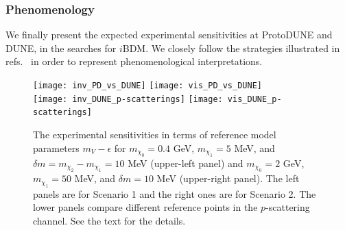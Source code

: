 

\subsubsection{Phenomenology}\label{Sec:Pheno}

We finally present the expected experimental sensitivities at ProtoDUNE and DUNE, in the searches for $i$BDM.
We closely follow the strategies illustrated in refs.~\cite{Giudice:2017zke, Chatterjee:2018mej, Kim:2018veo} in order to represent phenomenological interpretations. 

\begin{figure}[t]
\centering
\texttt{[image: inv\_PD\_vs\_DUNE]} 
\texttt{[image: vis\_PD\_vs\_DUNE]} \\
\vspace{0.3cm}
\texttt{[image: inv\_DUNE\_p-scatterings]}
\texttt{[image: vis\_DUNE\_p-scatterings]}
\caption{
The experimental sensitivities in terms of reference model parameters $m_V - \epsilon$ 
for $m_{\chi_0} = 0.4$ GeV, $m_{\chi_1} = 5$ MeV, and $\delta m = m_{\chi_2} - m_{\chi_1} = 10$ MeV (upper-left panel) and $m_{\chi_0} = 2$ GeV, $m_{\chi_1} = 50$ MeV, and $\delta m = 10$ MeV (upper-right panel).
The left panels are for Scenario 1 and the right ones are for Scenario 2.
The lower panels compare different reference points in the $p$-scattering channel.
See the text for the details.
\label{fig:darkphotonparameter} }
\end{figure}


